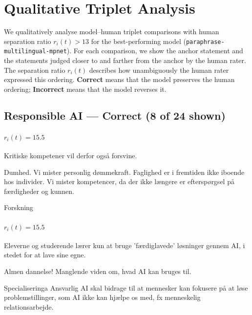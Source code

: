 \section{Qualitative Triplet Analysis}
\label{app:triplets}

We qualitatively analyse model--human triplet comparisons with human separation ratio $r_i(t) > 13$ for the best-performing model (\texttt{paraphrase-multilingual-mpnet}). For each comparison, we show the anchor statement and the statements judged closer to and farther from the anchor by the human rater. The separation ratio $r_i(t)$ describes how unambiguously the human rater expressed this ordering. \textbf{Correct} means that the model preserves the human ordering; \textbf{Incorrect} means that the model reverses it.

\subsection{Responsible AI --- Correct (8 of 24 shown)}
\label{app:triplets-rai-correct}

\paragraph{$r_i(t) = 15.5$}
\begin{description}[style=nextline,leftmargin=1em,font=\normalfont\bfseries]
  \item[Anchor] Kritiske kompetener vil derfor også forsvine.
  \item[Human-judged closer] Dumhed.   Vi mister personlig dømmekraft.   Faglighed er i fremtiden ikke iboende hos individer.   Vi mister kompetencer, da der ikke længere er efterspørgsel på færdigheder og kunnen.
  \item[Human-judged farther] Forskning
\end{description}
\paragraph{$r_i(t) = 15.5$}
\begin{description}[style=nextline,leftmargin=1em,font=\normalfont\bfseries]
  \item[Anchor] Eleverne og studerende lærer kun at bruge 'færdiglavede' løsninger gennem AI, i stedet for at lave sine egne.
  \item[Human-judged closer] Almen dannelse!  Manglende viden om, hvad AI kan bruges til.
  \item[Human-judged farther] Specialiseringa  Ansvarlig AI skal bidrage til at mennesker kan fokusere på at løse problemstillinger, som AI ikke kan hjælpe os med, fx menneskelig relationsarbejde.
\end{description}
